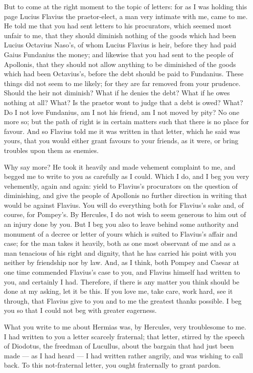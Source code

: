  But to come at the right moment to the topic of letters: for as I was holding this page Lucius Flavius the praetor-elect, a man very intimate with me, came to me. He told me that you had sent letters to his procurators, which seemed most unfair to me, that they should diminish nothing of the goods which had been Lucius Octavius Naso's, of whom Lucius Flavius is heir, before they had paid Gaius Fundanius the money; and likewise that you had sent to the people of Apollonis, that they should not allow anything to be diminished of the goods which had been Octavius's, before the debt should be paid to Fundanius. These things did not seem to me likely; for they are far removed from your prudence. Should the heir not diminish? What if he denies the debt? What if he owes nothing at all? What? Is the praetor wont to judge that a debt is owed? What? Do I not love Fundanius, am I not his friend, am I not moved by pity? No one more so; but the path of right is in certain matters such that there is no place for favour. And so Flavius told me it was written in that letter, which he said was yours, that you would either grant favours to your friends, as it were, or bring troubles upon them as enemies.

 Why say more? He took it heavily and made vehement complaint to me, and begged me to write to you as carefully as I could. Which I do, and I beg you very vehemently, again and again: yield to Flavius's procurators on the question of diminishing, and give the people of Apollonis no further direction in writing that would be against Flavius. You will do everything both for Flavius's sake and, of course, for Pompey's. By Hercules, I do not wish to seem generous to him out of an injury done by you. But I beg you also to leave behind some authority and monument of a decree or letter of yours which is suited to Flavius's affair and case; for the man takes it heavily, both as one most observant of me and as a man tenacious of his right and dignity, that he has carried his point with you neither by friendship nor by law. And, as I think, both Pompey and Caesar at one time commended Flavius's case to you, and Flavius himself had written to you, and certainly I had. Therefore, if there is any matter you think should be done at my asking, let it be this. If you love me, take care, work hard, see it through, that Flavius give to you and to me the greatest thanks possible. I beg you so that I could not beg with greater eagerness.

 What you write to me about Hermias was, by Hercules, very troublesome to me. I had written to you a letter scarcely fraternal; that letter, stirred by the speech of Diodotus, the freedman of Lucullus, about the bargain that had just been made --- as I had heard --- I had written rather angrily, and was wishing to call back. To this not-fraternal letter, you ought fraternally to grant pardon.

